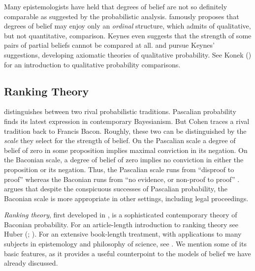 Many epistemologists have held that degrees of belief are not so definitely
comparable as suggested by the probabilistic analysis.
\citet{keynes1921treatise} famously proposes that degrees of belief may enjoy
only an {\em ordinal} structure, which admits of qualitative, but not
quantitative, comparison. Keynes even suggests that the strength of some pairs
of partial beliefs cannot be compared at all. \citet{koopman1940axioms} and
\citet{fine1973theories} pursue Keynes' suggestions, developing axiomatic
theories of qualitative probability. See Konek () for an
introduction to qualitative probability comparisons. 

\subsection{Ranking Theory}
\label{rankingtheory}

 distinguishes between two rival
probabilistic traditions. Pascalian probability finds its latest expression in
contemporary Bayesianism. But Cohen traces a rival tradition back to Francis
Bacon. Roughly, these two can be distinguished by the {\em scale} they select
for the strength of belief. On the Pascalian scale a degree of belief of zero in
some proposition implies maximal conviction in its negation. On the Baconian
scale, a degree of belief of zero implies no conviction in either the
proposition or its negation. Thus, the Pascalian scale runs from ``disproof to
proof'' whereas the Baconian runs from ``no evidence, or non-proof to proof''
\citep[p. 224]{cohen1980some}.  \citet{cohen1977probable} argues that despite
the conspicuous successes of Pascalian probability, the Baconian scale is more
appropriate in other settings, including legal proceedings.

{\em Ranking theory}, first developed in \citet{spohn1988ordinal}, is a
sophisticated contemporary theory of Baconian probability. For an article-length
introduction to ranking theory see Huber (; 
).
For an extensive book-length treatment, with applications to many subjects in
epistemology and philosophy of science, see \citet{spohn2012laws}. We mention
some of its basic features, as it provides a useful counterpoint to the models
of belief we have already discussed.

